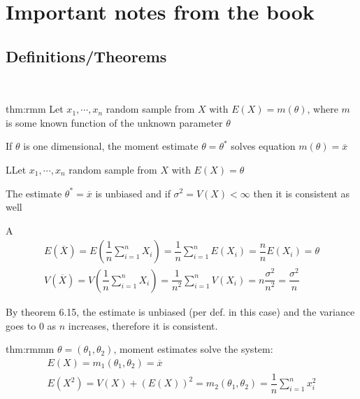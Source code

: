 \section{Important notes from the book}\par
\subsection{Definitions/Theorems}\hfill\\\par
\begin{theo}{thm:rmm}
  Let $x_1,\cdots,x_n$ random sample from $X$ with $E(X) = m(\theta)$, where $m$ is some known function of the unknown parameter $\theta$\par
  \noindent If $\theta$ is one dimensional, the moment estimate $\theta = \theta^*$ solves equation $m(\theta) = \overline{x}$ 
\end{theo}
\par\bigskip
\begin{theo}
  LLet $x_1,\cdots,x_n$ random sample from $X$ with $E(X) = \theta$\par
  \noindent The estimate $\theta^* = \overline{x}$ is unbiased and if $\sigma^2 = V(X)<\infty$ then it is consistent as well 
\end{theo}
\par\bigskip
\begin{prf}
  A
  \begin{equation*}
    \begin{gathered}
      E(\overline{X}) = E\left(\dfrac{1}{n}\sum_{i=1}^{n}X_i\right) = \dfrac{1}{n}\sum_{i=1}^{n}E(X_i) = \dfrac{n}{n}E(X_i) = \theta\\
      V(\overline{X}) = V\left(\dfrac{1}{n}\sum_{i=1}^{n}X_i\right) = \dfrac{1}{n^2}\sum_{i=1}^{n}V(X_i) = n\dfrac{\sigma^2}{n^2} = \dfrac{\sigma^2}{n}
    \end{gathered}
  \end{equation*}\par
  \noindent By theorem 6.15, the estimate is unbiased (per def. in this case) and the variance goes to 0 as $n$ increases, therefore it is consistent. 
\end{prf}
\par\bigskip
\begin{theo}{thm:rmmm}
  $\theta = (\theta_1,\theta_2)$, moment estimates solve the system:
  \begin{equation*}
    \begin{gathered}
      E(X) = m_1(\theta_1, \theta_2) = \overline{x}\\
      E(X^2) = V(X) + (E(X))^2 = m_2(\theta_1,\theta_2) = \dfrac{1}{n}\sum_{i=1}^{n}x_i^2
    \end{gathered}
  \end{equation*}
\end{theo}
